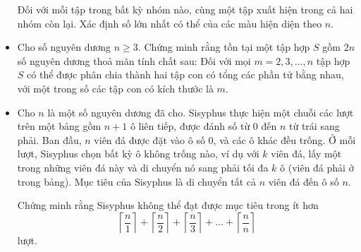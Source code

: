 \documentclass[11pt]{scrartcl}
\begin{document}
\begin{itemize}[label=, leftmargin=0em, itemsep=0.5em]
\begin{btvn}
        Đối với mỗi tập trong bất kỳ nhóm nào, cùng một tập xuất hiện trong cả hai nhóm còn lại. Xác định số lớn nhất có thể của các màu hiện diện theo $n$.
    \end{btvn}


    
    \item \begin{btvn}
        Cho số nguyên dương $n\geqslant 3$. Chứng minh rằng tồn tại một tập hợp $S$ gồm $2n$ số nguyên dương thoả mãn tính chất sau: Đối với mọi $m=2,3,...,n$ tập hợp $S$ có thể được phân chia thành hai tập con có tổng các phần tử bằng nhau, với một trong số các tập con có kích thước là $m$.
    \end{btvn}


    \item \begin{btvn}
        Cho $n$ là một số nguyên dương đã cho. Sisyphus thực hiện một chuỗi các lượt trên một bảng gồm $n + 1$ ô liên tiếp, được đánh số từ $0$ đến $n$ từ trái sang phải. Ban đầu, $n$ viên đá được đặt vào ô số $0$, và các ô khác đều trống. Ở mỗi lượt, Sisyphus chọn bất kỳ ô không trống nào, ví dụ với $k$ viên đá, lấy một trong những viên đá này và di chuyển nó sang phải tối đa $k$ ô (viên đá phải ở trong bảng). Mục tiêu của Sisyphus là di chuyển tất cả $n$ viên đá đến ô số $n$.

        Chứng minh rằng Sisyphus không thể đạt được mục tiêu trong ít hơn
        \[ \left \lceil \frac{n}{1} \right \rceil + \left \lceil \frac{n}{2} \right \rceil + \left \lceil \frac{n}{3} \right \rceil + \dots + \left \lceil \frac{n}{n} \right \rceil \]
        lượt.
    \end{btvn}


\end{itemize}
\end{document}
